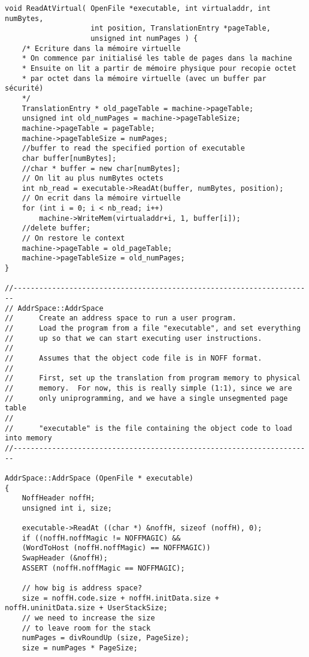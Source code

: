 \documentclass[a4paper,10pt]{article}
\begin{document}
\begin{lstlisting}
void ReadAtVirtual( OpenFile *executable, int virtualaddr, int numBytes,
                    int position, TranslationEntry *pageTable,
                    unsigned int numPages ) {
    /* Ecriture dans la mémoire virtuelle
    * On commence par initialisé les table de pages dans la machine
    * Ensuite on lit a partir de mémoire physique pour recopie octet
    * par octet dans la mémoire virtuelle (avec un buffer par sécurité)
    */
    TranslationEntry * old_pageTable = machine->pageTable;
    unsigned int old_numPages = machine->pageTableSize;
    machine->pageTable = pageTable;
    machine->pageTableSize = numPages;
    //buffer to read the specified portion of executable
    char buffer[numBytes];
    //char * buffer = new char[numBytes];
    // On lit au plus numBytes octets
    int nb_read = executable->ReadAt(buffer, numBytes, position);
    // On ecrit dans la mémoire virtuelle
    for (int i = 0; i < nb_read; i++)
        machine->WriteMem(virtualaddr+i, 1, buffer[i]);
    //delete buffer;
    // On restore le context
    machine->pageTable = old_pageTable;
    machine->pageTableSize = old_numPages;
}

//----------------------------------------------------------------------
// AddrSpace::AddrSpace
//      Create an address space to run a user program.
//      Load the program from a file "executable", and set everything
//      up so that we can start executing user instructions.
//
//      Assumes that the object code file is in NOFF format.
//
//      First, set up the translation from program memory to physical
//      memory.  For now, this is really simple (1:1), since we are
//      only uniprogramming, and we have a single unsegmented page table
//
//      "executable" is the file containing the object code to load into memory
//----------------------------------------------------------------------

AddrSpace::AddrSpace (OpenFile * executable)
{
    NoffHeader noffH;
    unsigned int i, size;

    executable->ReadAt ((char *) &noffH, sizeof (noffH), 0);
    if ((noffH.noffMagic != NOFFMAGIC) &&
    (WordToHost (noffH.noffMagic) == NOFFMAGIC))
    SwapHeader (&noffH);
    ASSERT (noffH.noffMagic == NOFFMAGIC);

    // how big is address space?
    size = noffH.code.size + noffH.initData.size + noffH.uninitData.size + UserStackSize;
    // we need to increase the size
    // to leave room for the stack
    numPages = divRoundUp (size, PageSize);
    size = numPages * PageSize;


\end{lstlisting}
\end{document}
